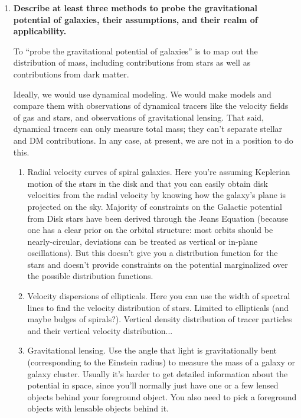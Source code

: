 \documentclass[12pt, letterpaper, preprint]{aastex}
\begin{document}
\begin{enumerate}
\item \textbf{Describe at least three methods to probe the gravitational potential of galaxies, their assumptions, and their realm of applicability.}

To ``probe the gravitational potential of galaxies''
is to map out the distribution of mass,
including contributions from stars as well as
contributions from dark matter. 

Ideally, we would use dynamical modeling.
We would make models and compare them with observations of dynamical tracers like the velocity fields of gas and stars, and observations of gravitational lensing.
That said, dynamical tracers can only measure total mass;
they can't separate stellar and DM contributions.
In any case, at present, we are not in a position to do this. 

\begin{enumerate}

\item Radial velocity curves of spiral galaxies. 
Here you're assuming Keplerian motion of the stars in the disk and that you can easily obtain disk velocities from the radial velocity by knowing how the galaxy's plane is projected on the sky. Majority of constraints on the Galactic potential from Disk stars have been derived through the Jeans Equation (because one has a clear prior on the orbital structure: most orbits should be nearly-circular, deviations can be treated as vertical or in-plane oscillations). But this doesn't give you a distribution function for the stars and doesn't provide constraints on the potential marginalized over the possible distribution functions.
      
\item Velocity dispersions of ellipticals. Here you can use the width of spectral lines to find the velocity distribution of stars. Limited to ellipticals (and maybe bulges of spirals?). Vertical density distribution of tracer particles and their vertical velocity distribution...
      
\item Gravitational lensing. Use the angle that light is gravitationally bent (corresponding to the Einstein radius) to measure the mass of a galaxy or galaxy cluster. Usually it's harder to get detailed information about the potential in space, since you'll normally just have one or a few lensed objects behind your foreground object. You also need to pick a foreground objects with lensable objects behind it.

\end{enumerate}

\end{enumerate}
\end{document}
